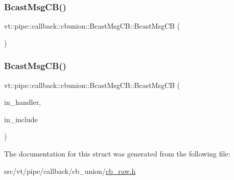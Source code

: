 \subsubsection{\texorpdfstring{Bcast\+Msg\+C\+B()}{BcastMsgCB()}\hspace{0.1cm}{\footnotesize\ttfamily [1/2]}}
{\footnotesize\ttfamily vt\+::pipe\+::callback\+::cbunion\+::\+Bcast\+Msg\+C\+B\+::\+Bcast\+Msg\+CB (\begin{DoxyParamCaption}{ }\end{DoxyParamCaption})\hspace{0.3cm}{\ttfamily [default]}}

\mbox{\label{structvt_1_1pipe_1_1callback_1_1cbunion_1_1_bcast_msg_c_b_a84205a21e90133ba3f52ceebac33d49e}} 
\subsubsection{\texorpdfstring{Bcast\+Msg\+C\+B()}{BcastMsgCB()}\hspace{0.1cm}{\footnotesize\ttfamily [2/2]}}
{\footnotesize\ttfamily vt\+::pipe\+::callback\+::cbunion\+::\+Bcast\+Msg\+C\+B\+::\+Bcast\+Msg\+CB (\begin{DoxyParamCaption}\item[{\hyperlink{namespacevt_af64846b57dfcaf104da3ef6967917573}{Handler\+Type} const \&}]{in\+\_\+handler,  }\item[{bool const \&}]{in\+\_\+include }\end{DoxyParamCaption})\hspace{0.3cm}{\ttfamily [inline]}}



The documentation for this struct was generated from the following file\+:\begin{DoxyCompactItemize}
\item 
src/vt/pipe/callback/cb\+\_\+union/\hyperlink{cb__raw_8h}{cb\+\_\+raw.\+h}\end{DoxyCompactItemize}
